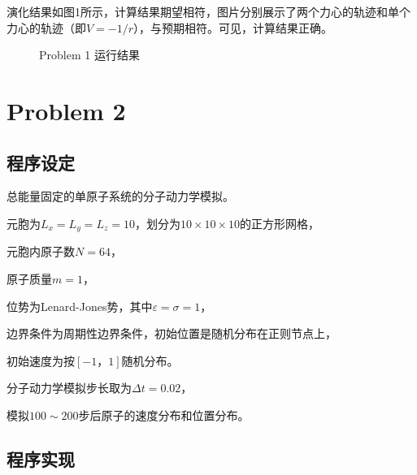 \documentclass{article}
\begin{document}
演化结果如图1所示，计算结果期望相符，图片分别展示了两个力心的轨迹和单个力心的轨迹（即$V=-1/r$），与预期相符。可见，计算结果正确。

\begin{figure}[tbp]
 \caption{Problem 1 运行结果}
\end{figure}

\section{Problem 2}
\subsection{程序设定}

总能量固定的单原子系统的分子动力学模拟。

元胞为$L_x=L_y=L_z=10$，划分为$10\times 10\times 10$的正方形网格，

元胞内原子数$N=64$，

原子质量$m=1$，

位势为Lenard-Jones势，其中$\varepsilon=\sigma=1$，

边界条件为周期性边界条件，初始位置是随机分布在正则节点上，

初始速度为按$[-1，1]$随机分布。

分子动力学模拟步长取为$\Delta t=0.02$，

模拟$100\sim200$步后原子的速度分布和位置分布。

\subsection{程序实现}
\end{document}

